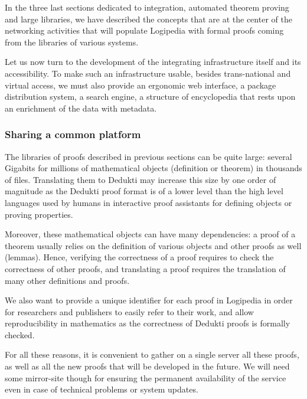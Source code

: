 
In the three last sections dedicated to integration, automated theorem
proving and large libraries, we have described the concepts that are
at the center of the networking activities that will populate
Logipedia with formal proofs coming from the libraries of various
systems.

Let us now turn to the development of the integrating infrastructure
itself and its accessibility.
To make such an infrastructure
usable, besides trans-national and virtual access,
we must also provide an ergonomic web interface, a package
distribution system, a search engine, a structure of encyclopedia
that rests upon an enrichment of the data with metadata.

\subsubsection*{Sharing a common platform}

The libraries of proofs described in previous sections can be quite
large: several Gigabits for millions of mathematical objects
(definition or theorem) in thousands of files. Translating them to
Dedukti may increase this size by one order of magnitude as the
Dedukti proof format is of a lower level than the high level languages
used by humans in interactive proof assistants for defining objects or
proving properties.

Moreover, these mathematical objects can have many dependencies: a
proof of a theorem usually relies on the definition of various objects
and other proofs as well (lemmas). Hence, verifying the correctness of
a proof requires to check the correctness of other proofs, and
translating a proof requires the translation of many other definitions
and proofs.

We also want to provide a unique identifier for each proof in
Logipedia in order for researchers and publishers to easily refer to
their work, and allow reproducibility in mathematics as the
correctness of Dedukti proofs is formally checked.

For all these reasons, it is convenient to gather on a single server
all these proofs, as well as all the new proofs that will be developed
in the future. We will need some mirror-site though for ensuring the
permanent availability of the service even in case of technical
problems or system updates.

